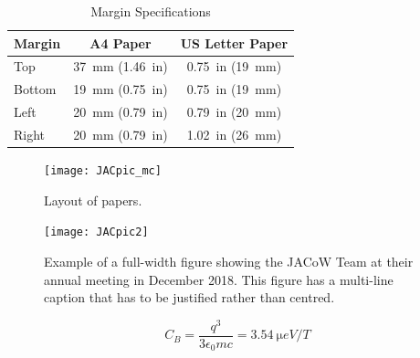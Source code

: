 \documentclass[letter,
               biblatex,     %
               keeplastbox,   %
               ]{jacow}
\begin{document}
\begin{table}[!hbt]
   \centering
   \caption{Margin Specifications}
   \begin{tabular}{lcc}
       \toprule
       \textbf{Margin} & \textbf{A4 Paper}                      & \textbf{US Letter Paper} \\
       \midrule
           Top         & \SI{37}{mm} (\SI{1.46}{in})            & \SI{0.75}{in} (\SI{19}{mm})        \\ %
          Bottom       & \SI{19}{mm} (\SI{0.75}{in})            & \SI{0.75}{in} (\SI{19}{mm})        \\ %
           Left        & \SI{20}{mm} (\SI{0.79}{in})            & \SI{0.79}{in} (\SI{20}{mm})        \\ %
           Right       & \SI{20}{mm} (\SI{0.79}{in})            & \SI{1.02}{in} (\SI{26}{mm})        \\
       \bottomrule
   \end{tabular}
   \label{tab:margins}
\end{table}


\begin{figure}[!htb]
   \centering
   \texttt{[image: JACpic\_mc]}
   \caption{Layout of papers.}
   \label{fig:paper_layout}
\end{figure}

\begin{figure}[!tbh]
    \centering
    \texttt{[image: JACpic2]}

    \caption{Example of a full-width figure showing the JACoW Team at their annual
    	     meeting in December 2018. This figure has a multi-line caption that has to be
    	     justified rather than centred.} %
    \label{fig:jacow_team}
\end{figure}

\begin{equation}\label{eq:label}
    C_B=\frac{q^3}{3\epsilon_{0} mc}=\SI{3.54}{\micro eV/T}
\end{equation}
\end{document}
